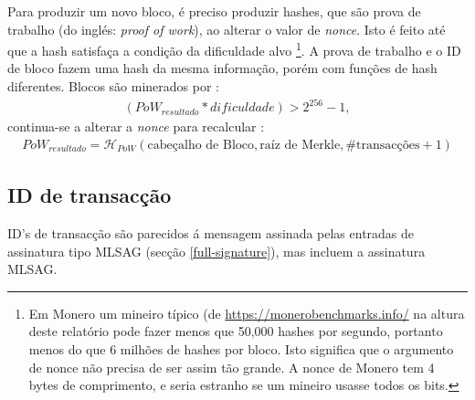 Para produzir um novo bloco, é preciso produzir hashes, que são prova de trabalho (do inglés: {\em proof of work}), ao alterar o valor de {\em nonce}. Isto é feito até que a hash satisfaça a condição da dificuldade alvo \footnote{Em Monero um mineiro típico (de \url{https://monerobenchmarks.info/} na altura deste relatório pode fazer menos que 50,000 hashes por segundo, portanto menos do que 6 milhões de hashes por bloco. Isto significa que o argumento de nonce não precisa de ser assim tão grande. A nonce de Monero tem 4 bytes de comprimento, e seria estranho se um mineiro usasse todos os bits.}. 
A prova de trabalho e o ID de bloco fazem uma hash da mesma informação, porém com funções de hash diferentes. Blocos são minerados por :
\begin{align*}
({PoW}_{resultado} * {dificuldade}) > 2^{256}-1 ,
\end{align*}
continua-se a alterar a {\em nonce} para recalcular :
\vspace{.175cm}
\begin{align*}
{PoW}_{resultado} = \mathcal{H}_{PoW}(\textrm{cabeçalho de Bloco}, \textrm{raíz de Merkle}, \# \textrm{transacções} + 1)
\end{align*}

\subsection{ID de transacção}
\label{subsec:transaction-id} %
ID's de transacção são parecidos á mensagem assinada pelas entradas de assinatura tipo MLSAG (secção \ref{full-signature}), mas incluem a assinatura MLSAG.


